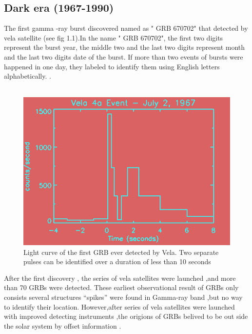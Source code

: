 \subsection{Dark era (1967-1990)}
 The first gamma -ray burst discovered  named as " GRB 670702" that  detected by vela satellite (see fig 1.1).In the name " GRB 670702", the first two digits represent the burst year, the middle two  and the last two digits represent month and the last two digits date of the burst. If more than two events of bursts were happened in one day, they labeled to identify them  using  English letters alphabetically. \citep {4} \citep { 5}.\\\\
\begin{figure}[h]
\begin{center}
\includegraphics[scale=0.2]{Figures/fig1.png}
\caption{Light curve of the first GRB ever detected by Vela. Two separate pulses can be identified over a duration of less than 10 seconds \citep{4}}
\end{center}
\end{figure}
After the first discovery , the series of vela satellites were launched ,and more than 70 GRBs were detected. These earliest observational result of GRBs only consists several structures “spikes” were found in Gamma-ray band ,but no way to identify their location. However,after series of  vela satellites were launched with improved detecting instruments ,the origions of GRBs belived to be out side the solar system by offset information \citep{4} \citep { 5}.\\\\
